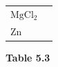\begin{enumerate}[noitemsep, label=\textbf{\arabic*}. ]
{{\begin{center}
\begin{tabular}[t]{|l|l|}
    
     \tabularnewline\cline{1-1}\cline{2-2}
    
    
        \begin{math}\mathrm{MgCl}{}_{2}\end{math} &
    
    
     \tabularnewline\cline{1-1}\cline{2-2}
    
    
        \begin{math}\mathrm{Zn}\end{math} &
    
    
     \tabularnewline\cline{1-1}\cline{2-2}
    \end{tabular}
      \end{center}
    \begin{center}{\small\bfseries Table 5.3}\end{center}
    
    \addtocounter{footnote}{-0}
    
          }{ %
        
    
}}
\end{enumerate}
